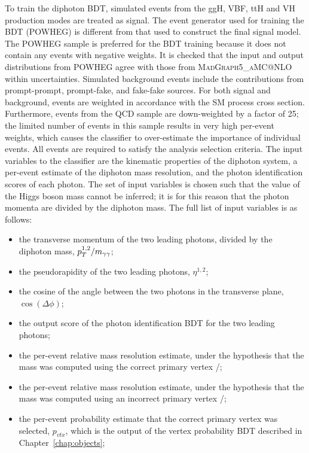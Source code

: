 To train the diphoton BDT, simulated events from the ggH, VBF, ttH 
and VH production modes are treated as signal. 
The event generator used for training the BDT (\textsc{POWHEG}) 
is different from that used to construct the final signal model.
The \textsc{POWHEG} sample is preferred for the BDT training because it does not contain
any events with negative weights.
It is checked that the input and output distributions from \textsc{POWHEG} agree with those
from \textsc{MadGraph5_{}aMC@NLO} within uncertainties.
Simulated background events include the contributions from prompt-prompt, prompt-fake, 
and fake-fake sources.
For both signal and background, 
events are weighted in accordance with the SM process cross section.
Furthermore, events from the QCD sample are down-weighted by a factor of 25;
the limited number of events in this sample results in very high per-event weights, 
which causes the classifier to over-estimate the importance of individual events.
All events are required to satisfy the analysis selection criteria.
The input variables to the classifier are the kinematic properties of the diphoton system, 
a per-event estimate of the diphoton mass resolution, 
and the photon identification scores of each photon.
The set of input variables is chosen such that the value of the Higgs boson mass cannot be inferred;
it is for this reason that the photon momenta are divided by the diphoton mass.
The full list of input variables is as follows:
\begin{itemize}
\item the transverse momentum of the two leading photons, divided by the diphoton mass, $p_T^{1,2}/m_{\gamma\gamma}$;
\item the pseudorapidity of the two leading photons, $\eta^{1,2}$;
\item the cosine of the angle between the two photons in the transverse plane, $\cos{(\Delta\phi)}$;
\item the output score of the photon identification BDT for the two leading photons;
\item the per-event relative mass resolution estimate, 
      under the hypothesis that the mass was computed using the correct primary vertex \srv/\mgg;
\item the per-event relative mass resolution estimate, 
      under the hypothesis that the mass was computed using an incorrect primary vertex \swv/\mgg;
\item the per-event probability estimate that the correct primary vertex was selected, $p_{vtx}$,
      which is the output of the vertex probability BDT described in Chapter~\ref{chap:objects};
\end{itemize}

